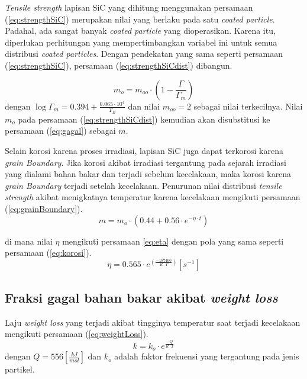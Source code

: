 \documentclass[a4paper,11pt]{report}
\begin{document}
\textit{Tensile strength} lapisan SiC yang dihitung menggunakan persamaan (\ref{eq:strengthSiC}) merupakan nilai yang berlaku pada satu \textit{coated particle}. Padahal, ada sangat banyak \textit{coated particle} yang dioperasikan. Karena itu, diperlukan perhitungan yang mempertimbangkan variabel ini untuk semua distribusi \textit{coated particles}. Dengan pendekatan yang sama seperti persamaan (\ref{eq:strengthSiC}), persamaan (\ref{eq:strengthSiCdist}) dibangun.

\begin{equation}
  m_o = m_{oo} \cdot \left( 1- \frac{\Gamma}{\Gamma_m} \right)
  \label{eq:strengthSiCdist}
\end{equation}
dengan $\log \Gamma_m = 0.394 + \frac{0.065 \cdot 10^4}{T_B}$ dan nilai $m_{oo}=2$ sebagai nilai terkecilnya. Nilai $m_o$ pada persamaan (\ref{eq:strengthSiCdist}) kemudian akan disubstitusi ke persamaan (\ref{eq:gagal}) sebagai $m$.


Selain korosi karena proses irradiasi, lapisan SiC juga dapat terkorosi karena \textit{grain Boundary}. Jika korosi akibat irradiasi tergantung pada sejarah irradiasi yang dialami bahan bakar dan terjadi sebelum kecelakaan, maka korosi karena \textit{grain Boundary} terjadi setelah kecelakaan. Penurunan nilai distribusi \textit{tensile strength} akibat menigkatnya temperatur karena kecelakaan mengikuti persamaan (\ref{eq:grainBoundary}).
\begin{equation}
  m=m_o \cdot \left( 0.44 + 0.56 \cdot e^{-\dot{\eta} \cdot t}\right)
  \label{eq:grainBoundary}
\end{equation}

di mana nilai $\dot{\eta}$ mengikuti persamaan {\ref{eq:eta}} dengan pola yang sama seperti persamaan (\ref{eq:korosi}).
\begin{equation}
  \dot{\eta}=0.565 \cdot e^{\left(\frac{-187400}{R \cdot T}\right)} [s^{-1}]
  \label{eq:eta}
\end{equation}

\subsection{Fraksi gagal bahan bakar akibat \textit{weight loss}}
Laju \textit{weight loss} yang terjadi akibat tingginya temperatur saat terjadi kecelakaan mengikuti persamaan (\ref{eq:weightLoss}).
\begin{equation}
  k=k_o \cdot e^{\frac{-Q}{R \cdot T}}
  \label{eq:weightLoss}
\end{equation}
dengan $Q=556 \left[ \frac{kJ}{mol}\right]$ dan $k_o$ adalah faktor frekuensi yang tergantung pada jenis partikel.
\end{document}
